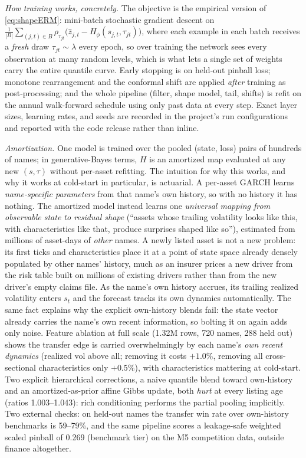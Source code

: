\documentclass[11pt]{article}
\theoremstyle{remark}
\begin{document}
\emph{How training works, concretely.} The objective is the empirical
version of \eqref{eq:shapeERM}: mini-batch stochastic gradient descent
on
$\tfrac{1}{|B|}\sum_{(j,t)\in B}\rho_{\tau_{jt}}\!\big(\widehat{z}_{j,t}
- H_\phi(s_{j,t},\tau_{jt})\big)$,
where each example in each batch receives a \emph{fresh} draw
$\tau_{jt} \sim \lambda$ every epoch, so over training the network sees
every observation at many random levels, which is what lets a single
set of weights carry the entire quantile curve. Early stopping is on
held-out pinball loss; monotone rearrangement and the conformal shift
are applied \emph{after} training as post-processing; and the whole
pipeline (filter, shape model, tail, shifts) is refit on the annual
walk-forward schedule using only past data at every step. Exact layer
sizes, learning rates, and seeds are recorded in the project's run
configurations and reported with the code release rather than inline.

\emph{Amortization.} One model is trained over the pooled (state, loss)
pairs of hundreds of names; in generative-Bayes terms, $H$ is an
amortized map evaluated at any new $(s,\tau)$ without per-asset
refitting. The intuition for why this works, and why it works at
cold-start in particular, is actuarial. A per-asset GARCH learns
\emph{name-specific parameters} from that name's own history, so with no
history it has nothing. The amortized model instead learns one
\emph{universal mapping from observable state to residual shape}
(``assets whose trailing volatility looks like this, with
characteristics like that, produce surprises shaped like so''),
estimated from millions of asset-days of \emph{other} names. A newly
listed asset is not a new problem: its first ticks and characteristics
place it at a point of state space already densely populated by other
names' history, much as an insurer prices a new driver from the risk
table built on millions of existing drivers rather than from the new
driver's empty claims file. As the name's own history accrues, its
trailing realized volatility enters $s_t$ and the forecast tracks its
own dynamics automatically. The same fact explains why the
explicit own-history blends fail: the state vector already carries the
name's own recent information, so bolting it on again adds only noise. Feature ablation at full scale (1.32M rows, 720 names, 288
held out) shows the transfer edge is carried overwhelmingly by each
name's \emph{own recent dynamics} (realized vol above all; removing it
costs $+1.0\%$, removing all cross-sectional characteristics only
$+0.5\%$), with characteristics mattering at cold-start. Two explicit hierarchical corrections, a naive quantile blend toward
own-history and an amortized-as-prior affine Gibbs update, both
\emph{hurt} at every listing age (ratios 1.003--1.043): rich
conditioning performs the partial pooling implicitly. Two external checks: on held-out names the
transfer win rate over own-history benchmarks is 59--79\%, and the same
pipeline scores a leakage-safe weighted scaled pinball of 0.269
(benchmark tier) on the M5 competition data, outside finance
altogether.
\end{document}
